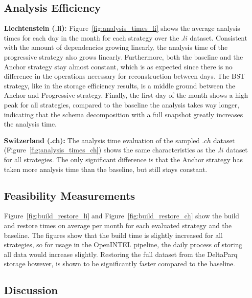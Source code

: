 \subsection{Analysis Efficiency}

\hspace{\parindent}\textbf{Liechtenstein (.li):} Figure~\ref{fig:analysis_times_li} shows the average analysis times for each day in the month for each strategy over the $.li$ dataset.
Consistent with the amount of dependencies growing linearly, the analysis time of the progressive strategy also grows linearly. Furthermore,
both the baseline and the Anchor strategy stay almost constant, which is as expected since there is no difference in the operations necessary 
for reconstruction between days. The BST strategy, like in the storage efficiency results, is a middle ground between the Anchor and Progressive 
strategy. Finally, the first day of the month shows a high peak for all strategies, compared to the baseline the analysis takes way longer, 
indicating that the schema decomposition with a full snapshot greatly increases the analysis time.

\textbf{Switzerland (.ch):} The analysis time evaluation of the sampled $.ch$ dataset (Figure~\ref{fig:analysis_times_ch}) shows the same characteristics as the $.li$ 
dataset for all strategies. The only significant difference is that the Anchor strategy has taken more analysis time than the baseline, but 
still stays constant.

\subsection{Feasibility Measurements}




Figure~\ref{fig:build_restore_li} and Figure~\ref{fig:build_restore_ch} show the build and restore times on average per month 
for each evaluated strategy and the baseline. The figures show that the build time is slightly increased for all strategies, so 
for usage in the OpenINTEL pipeline, the daily process of storing all data would increase slightly. Restoring the full dataset 
from the DeltaParq storage however, is shown to be significantly faster compared to the baseline.

\subsection{Discussion}


